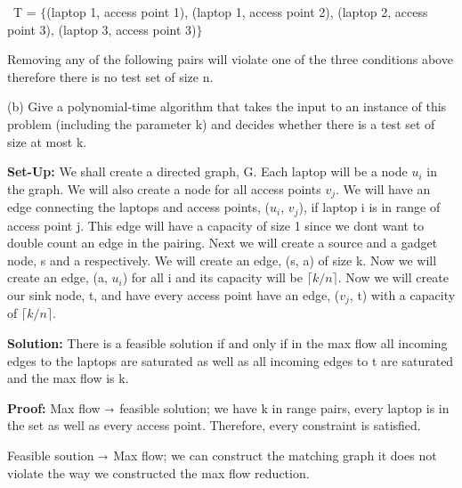 \documentclass{article}
\begin{document}
{\centering\ T = $\{$(laptop 1, access point 1), (laptop 1, access point 2),
(laptop 2, access point 3), (laptop 3, access point 3)$\}$ \par}

Removing any of the following pairs will violate one of the three conditions
above therefore there is no test set of size n. \newline


(b) Give a polynomial-time algorithm that takes the input to an instance of
this problem (including the parameter k) and decides whether there is a test set
of size at most k. \newline

\textbf{Set-Up:}  We shall create a directed graph, G.  Each laptop will be a node $u_i$
in the graph.  We will also create a node for all access points $v_j$.  We will have an edge connecting
the laptops and access points, ($u_i$, $v_j$), if laptop i is in range of access point j.  This edge
will have a capacity of size 1 since we dont want to double count an edge in the pairing.
Next we will create a source and a gadget node, s and a respectively.  We will create an edge,
(s, a) of size k.  Now we will create an edge, (a, $u_i$) for all i and its capacity
will be $\lceil k/n \rceil$.  Now we will create our sink node, t, and have every access point
have an edge, ($v_j$, t) with a capacity of $\lceil k/n \rceil$.


\textbf{Solution:} There is a feasible solution if and only if in the max flow
all incoming edges to the laptops are saturated as well as all incoming edges to t
are saturated and the max flow is k.


\textbf{Proof:} Max flow $\shortrightarrow$ feasible solution; we have k in range pairs,
every laptop is in the set as well as every access point.  Therefore, every constraint
is satisfied.

 Feasible soution $\shortrightarrow$ Max flow; we can construct the matching graph
it does not violate the way we constructed the max flow reduction.
\end{document}
